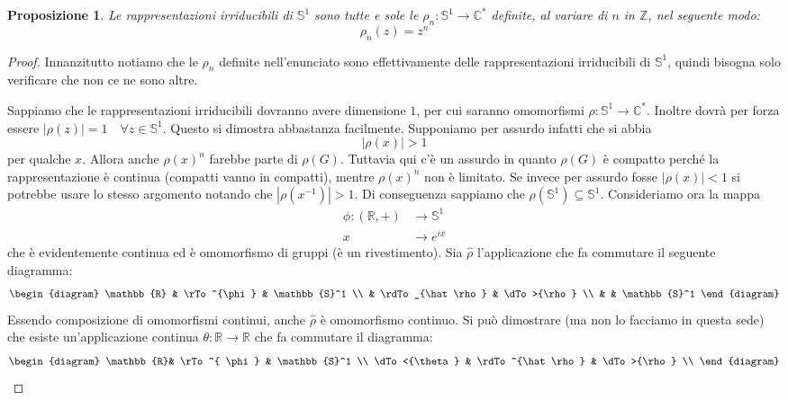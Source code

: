 \documentclass[11pt]{article}
\theoremstyle{plain}
\newtheorem{prop}[thm]{Proposizione}
\theoremstyle{definition}
\theoremstyle{remark}
\newcommand{\C}{\mathbb{C}}
\newcommand{\R}{\mathbb{R}}
\newcommand{\Z}{\mathbb{Z}}
\newcommand{\tridiag}[6]{
	  \begin{diagram}
	  #1 & \rTo^{#2}  & #3        \\
	     & \rdTo_{#6} & \dTo>{#4}   \\
	     &          & #5
	  \end{diagram}
}
\begin{document}
\begin{prop} 
  Le rappresentazioni irriducibili di $\mathbb{S}^1$ sono tutte e sole le $\rho_n:\mathbb{S}^1\to\C^*$ definite, al variare di $n$ in $\Z$, nel seguente modo:
  \[ \rho_n(z) = z^n \]
\end{prop}


\begin{proof}
  Innanzitutto notiamo che le $\rho_n$ definite nell'enunciato sono effettivamente delle rappresentazioni irriducibili di $\mathbb{S}^1$, quindi bisogna solo verificare che non ce ne sono altre.

  Sappiamo che le rappresentazioni irriducibili dovranno avere dimensione $1$, per cui saranno omomorfismi $\rho:\mathbb{S}^1\to\C^*$. Inoltre dovrà per forza essere $|\rho(z)| = 1 \quad \forall z \in \mathbb{S}^1$. Questo si dimostra abbastanza facilmente. Supponiamo per assurdo infatti che si abbia
  \[ |\rho(x)| > 1\]
  per qualche $x$. Allora anche $\rho(x)^n$ farebbe parte di $\rho(G)$. Tuttavia qui c'è un assurdo in quanto $\rho(G)$ è compatto perché la rappresentazione è continua (compatti vanno in compatti), mentre $\rho(x)^n$ non è limitato. Se invece per assurdo fosse $|\rho(x)| < 1$ si potrebbe usare lo stesso argomento notando che $|\rho(x^{-1})| > 1$.
  Di conseguenza sappiamo che $\rho(\mathbb{S}^1) \subseteq \mathbb{S}^1$.
  Consideriamo ora la mappa
  \begin{align*} 
    \phi : (\R, +) &\to \mathbb{S}^1 \\
    x &\to  e^{ix}
  \end{align*}
  che è evidentemente continua ed è omomorfismo di gruppi (è un rivestimento).
  Sia $\hat\rho$ l'applicazione che fa commutare il seguente diagramma:
  \[\tridiag \R \phi {\mathbb{S}^1} \rho {\mathbb{S}^1} {\hat\rho}\]
  Essendo composizione di omomorfismi continui, anche $\hat\rho$ è omomorfismo continuo. Si può dimostrare (ma non lo facciamo in questa sede) che esiste un'applicazione continua $\theta:\R\to\R$ che fa commutare il diagramma:
  \[
  \begin{diagram}
    \R          & \rTo^{ \phi }         & \mathbb{S}^1           \\
    \dTo<{\theta}   & \rdTo^{\hat \rho}     & \dTo>{\rho}            \\

\end{diagram}\]
\end{proof}
\end{document}

